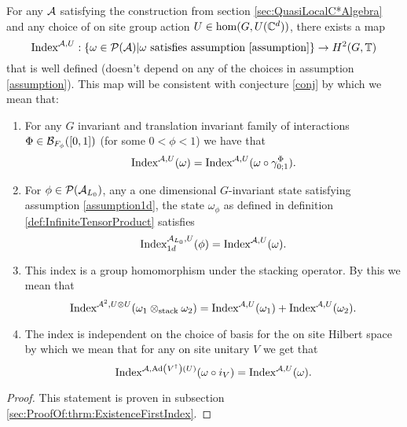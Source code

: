 \documentclass[11pt,a4paper,twoside]{article}
\numberwithin{equation}{section}
\begin{document}
\begin{theorem}\label{thrm:ExistenceFirstIndex}
	For any $\AA$ satisfying the construction from section \ref{sec:QuasiLocalC*Algebra} and any choice of on site group action $U\in\hom(G,U(\CC^d))$, there exists a map
	\begin{equation}
		\textrm{Index}^{\AA,U}:\{\omega\in\PP(\AA)|\omega\text{ satisfies assumption \ref{assumption}}\}\rightarrow H^2(G,\TT)
	\end{equation}
	that is well defined (doesn't depend on any of the choices in assumption \ref{assumption}). This map will be consistent with conjecture \ref{conj} by which we mean that:
	\begin{enumerate}
		\item For any $G$ invariant and translation invariant family of interactions $\Phi\in\BB_{F_{\phi}}([0,1])$ (for some $0<\phi<1$) we have that
		\begin{equation}
			\textrm{Index}^{\AA,U}(\omega)=\textrm{Index}^{\AA,U}(\omega\circ\gamma^{\Phi}_{0;1}).
		\end{equation}
		\item For $\phi\in\PP(\AA_{L_0})$, any a one dimensional $G$-invariant state satisfying assumption \ref{assumption1d}, the state $\omega_\phi$ as defined in definition \ref{def:InfiniteTensorProduct} satisfies
		\begin{equation}
			\textrm{Index}^{\AA_{L_0},U}_{1d}(\phi)=\textrm{Index}^{\AA,U}(\omega).
		\end{equation}
		\item This index is a group homomorphism under the stacking operator. By this we mean that
		\begin{equation}
			\textrm{Index}^{\AA^2,U\otimes U}(\omega_1\otimes_{\text{stack}}\omega_2)=\textrm{Index}^{\AA,U}(\omega_1)+\textrm{Index}^{\AA,U}(\omega_2).
		\end{equation}
		\item The index is independent on the choice of basis for the on site Hilbert space by which we mean that for any on site unitary $V$ we get that
		\begin{equation}
			\textrm{Index}^{\AA,\Ad{V^\dagger}(U)}(\omega\circ i_V)=\textrm{Index}^{\AA,U}(\omega).
		\end{equation}
	\end{enumerate}
\end{theorem}
\begin{proof}
	This statement is proven in subsection \ref{sec:ProofOf:thrm:ExistenceFirstIndex}.
\end{proof}
\end{document}
